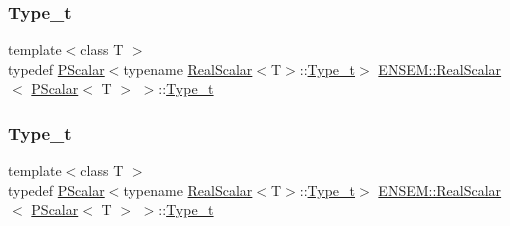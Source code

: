 \subsubsection{\texorpdfstring{Type\_t}{Type\_t}\hspace{0.1cm}{\footnotesize\ttfamily [1/3]}}
{\footnotesize\ttfamily template$<$class T $>$ \\
typedef \mbox{\hyperlink{classENSEM_1_1PScalar}{P\+Scalar}}$<$typename \mbox{\hyperlink{structENSEM_1_1RealScalar}{Real\+Scalar}}$<$T$>$\+::\mbox{\hyperlink{structENSEM_1_1RealScalar_3_01PScalar_3_01T_01_4_01_4_a904a917e492c04b2e0f09ff24b5c6f1c}{Type\+\_\+t}}$>$ \mbox{\hyperlink{structENSEM_1_1RealScalar}{E\+N\+S\+E\+M\+::\+Real\+Scalar}}$<$ \mbox{\hyperlink{classENSEM_1_1PScalar}{P\+Scalar}}$<$ T $>$ $>$\+::\mbox{\hyperlink{structENSEM_1_1RealScalar_3_01PScalar_3_01T_01_4_01_4_a904a917e492c04b2e0f09ff24b5c6f1c}{Type\+\_\+t}}}

\mbox{\label{structENSEM_1_1RealScalar_3_01PScalar_3_01T_01_4_01_4_a904a917e492c04b2e0f09ff24b5c6f1c}} 
\subsubsection{\texorpdfstring{Type\_t}{Type\_t}\hspace{0.1cm}{\footnotesize\ttfamily [2/3]}}
{\footnotesize\ttfamily template$<$class T $>$ \\
typedef \mbox{\hyperlink{classENSEM_1_1PScalar}{P\+Scalar}}$<$typename \mbox{\hyperlink{structENSEM_1_1RealScalar}{Real\+Scalar}}$<$T$>$\+::\mbox{\hyperlink{structENSEM_1_1RealScalar_3_01PScalar_3_01T_01_4_01_4_a904a917e492c04b2e0f09ff24b5c6f1c}{Type\+\_\+t}}$>$ \mbox{\hyperlink{structENSEM_1_1RealScalar}{E\+N\+S\+E\+M\+::\+Real\+Scalar}}$<$ \mbox{\hyperlink{classENSEM_1_1PScalar}{P\+Scalar}}$<$ T $>$ $>$\+::\mbox{\hyperlink{structENSEM_1_1RealScalar_3_01PScalar_3_01T_01_4_01_4_a904a917e492c04b2e0f09ff24b5c6f1c}{Type\+\_\+t}}}

\mbox{\label{structENSEM_1_1RealScalar_3_01PScalar_3_01T_01_4_01_4_a904a917e492c04b2e0f09ff24b5c6f1c}} 
